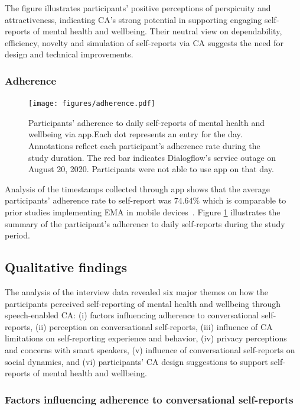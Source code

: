     The figure illustrates participants' positive perceptions of perspicuity and attractiveness, indicating \ac{CA}'s strong potential in supporting engaging self-reports of mental health and wellbeing. Their neutral view on dependability, efficiency, novelty and simulation of self-reports via \ac{CA} suggests the need for design and technical improvements.


    \subsubsection{Adherence}  
        \begin{figure}
            \centering
            \texttt{[image: figures/adherence.pdf]}
            \caption{Participants' adherence to daily self-reports of mental health and wellbeing via \acl{app}.Each dot represents an entry for the day. Annotations reflect each participant's adherence rate during the study duration. The red bar indicates Dialogflow's service outage on August 20, 2020. Participants were not able to use \acl{app} on that day.}
            \label{fig:adherence}
        \end{figure}
        
        Analysis of the timestamps collected through \acl{app} shows that the average participants' adherence rate to self-report was $74.64\%$ which is comparable to prior studies implementing \ac{EMA} in mobile devices~\cite{wen2017compliance}. Figure \ref{fig:adherence} illustrates the summary of the participant's adherence to daily self-reports during the study period. 
        
    \subsection{Qualitative findings}
    The analysis of the interview data revealed six major themes on how the participants perceived self-reporting of mental health and wellbeing through speech-enabled \ac{CA}: 
        (i) factors influencing adherence to conversational self-reports,
        (ii) perception on conversational self-reports,
        (iii) influence of \ac{CA} limitations on self-reporting experience and behavior,
        (iv) privacy perceptions and concerns with smart speakers,
        (v) influence of conversational self-reports on social dynamics, and
        (vi) participants' \ac{CA} design suggestions to support self-reports of mental health and wellbeing.
    
    \subsubsection{Factors influencing adherence to conversational self-reports }
        
